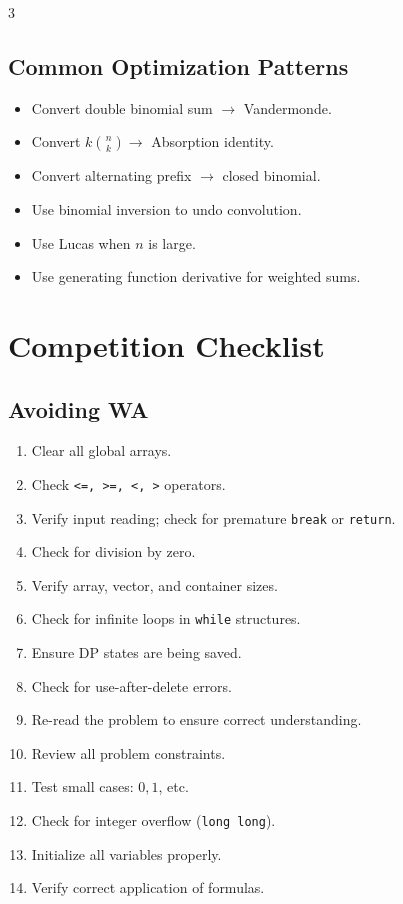 \begin{multicols*}{3}
\subsection{Common Optimization Patterns}
\begin{itemize}
    \item Convert double binomial sum $\rightarrow$ Vandermonde.
    \item Convert $\displaystyle k{n \choose k} \rightarrow$ Absorption identity.
    \item Convert alternating prefix $\rightarrow$ closed binomial.
    \item Use binomial inversion to undo convolution.
    \item Use Lucas when $n$ is large.
    \item Use generating function derivative for weighted sums.
\end{itemize}
\section{Competition Checklist}
\subsection{Avoiding WA}
\begin{enumerate}
    \item Clear all global arrays.
    \item Check \texttt{<=, >=, <, >} operators.
    \item Verify input reading; check for premature \texttt{break} or \texttt{return}.
    \item Check for division by zero.
    \item Verify array, vector, and container sizes.
    \item Check for infinite loops in \texttt{while} structures.
    \item Ensure DP states are being saved.
    \item Check for use-after-delete errors.
    \item Re-read the problem to ensure correct understanding.
    \item Review all problem constraints.
    \item Test small cases: $0, 1$, etc.
    \item Check for integer overflow (\texttt{long long}).
    \item Initialize all variables properly.
    \item Verify correct application of formulas.
\end{enumerate}


\end{multicols*}
